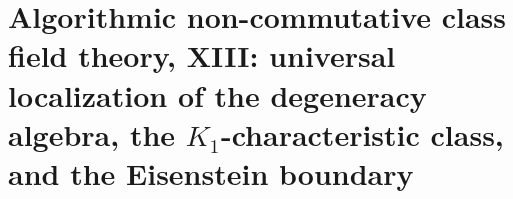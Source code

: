 \renewcommand{\HS}{\cH_\Sigma}
\chapter[\texorpdfstring{XIII. Universal localization of the degeneracy algebra, the $K_1$-characteristic class, and the
Eisenstein boundary}{XIII. Universal localization of the degeneracy algebra, the K1-characteristic class, and the Eisenstein boundary}]{\texorpdfstring{Algorithmic non-commutative class field theory, XIII: universal localization of the degeneracy algebra, the $K_1$-characteristic class, and the
Eisenstein boundary}{Algorithmic non-commutative class field theory, XIII: universal localization of the degeneracy algebra, the K1-characteristic class, and the Eisenstein boundary}}\label{chap:XIII}
